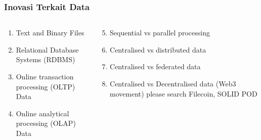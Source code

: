 \documentclass[aspectratio=169, table]{beamer}
\begin{document}
	
	
	
	
	\begin{frame}
		\frametitle{Inovasi Terkait Data}
		\begin{columns}
			\begin{column}{0.5\textwidth}
				\begin{center}
					\begin{enumerate}
						\item Text and Binary Files
						\item Relational Database Systems (RDBMS)
						\item Online transaction processing (OLTP) Data
						\item Online analytical processing (OLAP) Data
					
					\end{enumerate}
				\end{center}
			\end{column}
			\begin{column}{0.5\textwidth}
				\begin{center}
					\begin{enumerate}
						\setcounter{enumi}{4}
						
						\item Sequential vs parallel processing
						\item Centralised vs distributed data
						\item Centralised vs federated data
						\item Centralised vs Decentralised data (Web3 movement) please search Filecoin, SOLID POD
					\end{enumerate}
				\end{center}
			\end{column}
		\end{columns}
	\end{frame}
	
\end{document}
